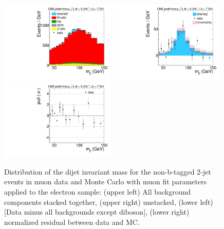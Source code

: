 \begin{figure}[h!]
  {\centering
    \includegraphics[width=0.49\textwidth]{figs/ScaleAndMatchingCrossChecks/el2JNoBTag_fMUfSUMuonDefault/Wjj_Diboson_Muon_2jets_Stacked.pdf}
    \includegraphics[width=0.49\textwidth]{figs/ScaleAndMatchingCrossChecks/el2JNoBTag_fMUfSUMuonDefault/Wjj_Diboson_Muon_2jets_Subtracted.pdf}
    \includegraphics[width=0.49\textwidth]{figs/ScaleAndMatchingCrossChecks/el2JNoBTag_fMUfSUMuonDefault/Wjj_Diboson_Muon_2jets_Pull.pdf}
    \caption{Distribution of the dijet invariant mass for the non-b-tagged 2-jet events in muon data and Monte Carlo with muon fit parameters applied to the electron sample: 
      (upper left) All background components stacked together, 
      (upper right) unstacked, (lower left) [Data minus all backgrounds except diboson],  
      (lower right) normalized residual between data and MC. }
    \label{fig:fsufmuXcheck_fMUfSUMuonDefault}}
\end{figure}

\clearpage
